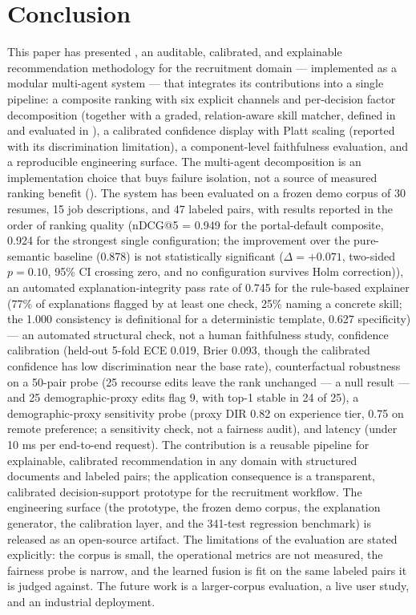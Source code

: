 \section{Conclusion}\label{sec:8}

This paper has presented \JobMatch, an auditable, calibrated, and explainable recommendation methodology for the recruitment domain --- implemented as a modular multi-agent system --- that integrates its contributions into a single pipeline: a composite ranking with six explicit channels and per-decision factor decomposition (together with a graded, relation-aware skill matcher, defined in  and evaluated in ), a calibrated confidence display with Platt scaling (reported with its discrimination limitation), a component-level faithfulness evaluation, and a reproducible engineering surface. The multi-agent decomposition is an implementation choice that buys failure isolation, not a source of measured ranking benefit ().
The system has been evaluated on a frozen demo corpus of 30 resumes, 15 job descriptions, and 47 labeled pairs, with results reported in the order of ranking quality (nDCG@5 = 0.949 for the portal-default composite, 0.924 for the strongest single configuration; the improvement over the pure-semantic baseline (0.878) is not statistically significant ($\Delta = +0.071$, two-sided $p = 0.10$, 95\% CI crossing zero, and no configuration survives Holm correction)), an automated explanation-integrity pass rate of 0.745 for the rule-based explainer (77\% of explanations flagged by at least one check, 25\% naming a concrete skill; the 1.000 consistency is definitional for a deterministic template, 0.627 specificity) --- an automated structural check, not a human faithfulness study, confidence calibration (held-out 5-fold ECE 0.019, Brier 0.093, though the calibrated confidence has low discrimination near the base rate), counterfactual robustness on a 50-pair probe (25 recourse edits leave the rank unchanged --- a null result --- and 25 demographic-proxy edits flag 9, with top-1 stable in 24 of 25), a demographic-proxy sensitivity probe (proxy DIR 0.82 on experience tier, 0.75 on remote preference; a sensitivity check, not a fairness audit), and latency (under 10 ms per end-to-end request).
The contribution is a reusable pipeline for explainable, calibrated recommendation in any domain with structured documents and labeled pairs; the application consequence is a transparent, calibrated decision-support prototype for the recruitment workflow.
The engineering surface (the prototype, the frozen demo corpus, the explanation generator, the calibration layer, and the 341-test regression benchmark) is released as an open-source artifact.
The limitations of the evaluation are stated explicitly: the corpus is small, the operational metrics are not measured, the fairness probe is narrow, and the learned fusion is fit on the same labeled pairs it is judged against.
The future work is a larger-corpus evaluation, a live user study, and an industrial deployment.

